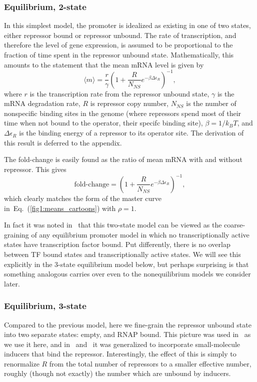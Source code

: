 \documentclass[12pt]{article}%
\newcommand{\eq}[1]{Eq.~(\ref{#1})}
\begin{document}
\subsubsection{Equilibrium, 2-state}
In this simplest model, the promoter is idealized as existing in
one of two states, either repressor bound or repressor unbound.
The rate of transcription, and therefore the level of gene
expression, is assumed to be proportional to the fraction of time
spent in the repressor unbound state.
Mathematically, this amounts to the statement that the mean mRNA level is
given by
\begin{equation}
\langle m \rangle = \frac{r}{\gamma}
        \left(1 + \frac{R}{N_{NS}} e^{-\beta\Delta\epsilon_R}\right)^{-1},
\end{equation}
where $r$ is the transcription rate from the repressor unbound
state, $\gamma$ is the mRNA degradation rate, $R$ is repressor
copy number, $N_{NS}$ is the number of nonspecific binding sites
in the genome (where repressors spend most of their time when not
bound to the operator, their specifc binding site),
$\beta=1/k_BT$, and $\Delta\epsilon_R$ is the binding energy of a
repressor to its operator site. The derivation of this result is deferred
to the appendix.

The fold-change is easily found as the ratio of mean mRNA with
and without repressor. This gives
\begin{equation}
\text{fold-change}
= \left(1 + \frac{R}{N_{NS}} e^{-\beta\Delta\epsilon_R}\right)^{-1},
\end{equation}
which clearly matches the form of the master curve
in~\eq{fig1:means_cartoons} with $\rho=1$.

In fact it was noted in~\cite{Chure2019} that this two-state
model can be viewed as the coarse-graining of any equilibrium
promoter model in which no transcriptionally active states have
transcription factor bound. Put differently, there is no overlap
between TF bound states and transcriptionally active states. We
will see this explicitly in the 3-state equilibrium model below,
but perhaps surprising is that something analogous carries over
even to the nonequilibrium models we consider later.

\subsubsection{Equilibrium, 3-state}
Compared to the previous model, here we fine-grain the repressor
unbound state into two separate states: empty, and RNAP bound.
This picture was used in~\cite{Garcia2011a} as we use it here,
and in~\cite{Razo-Mejia2018} and~\cite{Chure2019} it was generalized
to incorporate small-molecule inducers that bind the repressor.
Interestingly, the effect of this is simply to renormalize $R$
from the total number of repressors to a smaller effective number,
roughly (though not exactly) the number which are unbound by inducers.
\end{document}
